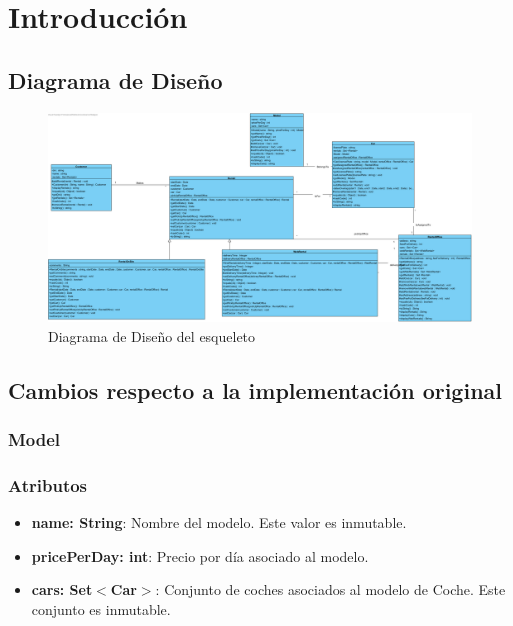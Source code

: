 \section{Introducción}

\subsection{Diagrama de Diseño}

\begin{figure}[H]
    \centering
     \includegraphics[width=1\linewidth]{assets/diagramas/UML_Esqueleto.png}
     \caption{Diagrama de Diseño del esqueleto}
\end{figure}

\subsection{Cambios respecto a la implementación original}

\subsubsection{Model}

\subsubsection*{Atributos}

\begin{itemize}
    \item \textbf{name: String}: Nombre del modelo. Este valor es inmutable.
    \item \textbf{pricePerDay: int}: Precio por día asociado al modelo.
    \item \textbf{cars: Set$<$Car$>$}: Conjunto de coches asociados al modelo de Coche. Este conjunto es  inmutable.
\end{itemize}

